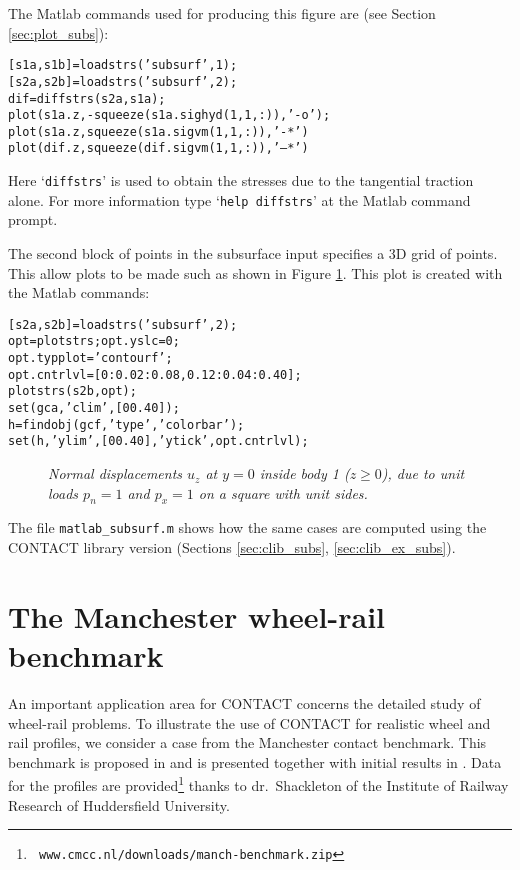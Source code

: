 \documentclass[12pt]{report}
\begin{document}
The Matlab commands used for producing this figure are (see Section
\ref{sec:plot_subs}):
\begin{alltt}\small
  % load results for cases 1 and 2, each using two blocks 'a' and 'b'
  [s1a, s1b] = loadstrs('subsurf', 1);
  [s2a, s2b] = loadstrs('subsurf', 2);
  dif = diffstrs(s2a, s1a);
  plot(s1a.z, -squeeze(s1a.sighyd(1,1,:)), '-o');
  plot(s1a.z,  squeeze(s1a.sigvm(1,1,:)), '-*')
  plot(dif.z,  squeeze(dif.sigvm(1,1,:)), '--*')
\end{alltt}
Here `{\tt diffstrs}' is used to obtain the stresses due to the tangential
traction alone. For more information type `{\tt help diffstrs}' at the
Matlab command prompt.

The second block of points in the subsurface input specifies a 3D grid of
points. This allow plots to be made such as shown in Figure
\ref{fig:subsurf2}. This plot is created with the Matlab commands:
\begin{alltt}\small
  [s2a, s2b] = loadstrs('subsurf', 2);
  opt = plotstrs; opt.yslc = 0;
  opt.typplot = 'contourf';
  opt.cntrlvl = [0:0.02:0.08, 0.12:0.04:0.40];
  plotstrs(s2b, opt);
  set(gca,'clim',[0 0.40]);
  h=findobj(gcf,'type','colorbar');
  set(h, 'ylim',[0 0.40], 'ytick',opt.cntrlvl);
\end{alltt}

\begin{figure}[bt]
\centering
{}
\caption{\em Normal displacements $u_z$ at $y=0$ inside body 1 ($z\ge 0$),
due to unit loads $p_n=1$ and $p_x=1$ on a square with unit sides.}
\label{fig:subsurf2}
\end{figure}

The file {\tt matlab\_subsurf.m} shows how the same cases are computed
using the CONTACT library version (Sections \ref{sec:clib_subs},
\ref{sec:clib_ex_subs}).

\section{The Manchester wheel-rail benchmark}
\label{sec:ex_mbench}

An important application area for CONTACT concerns the detailed study of
wheel-rail problems. To illustrate the use of CONTACT for
realistic wheel and rail profiles, we consider a case from the Manchester
contact benchmark. This benchmark is proposed in \cite{Shackleton2006} and is
presented together with initial results in \cite{Shackleton2008}. Data for
the profiles are provided\footnote{\tt
www.cmcc.nl/downloads/manch-benchmark.zip} thanks to dr.\ Shackleton of
the Institute of Railway Research of Huddersfield University.
\end{document}
